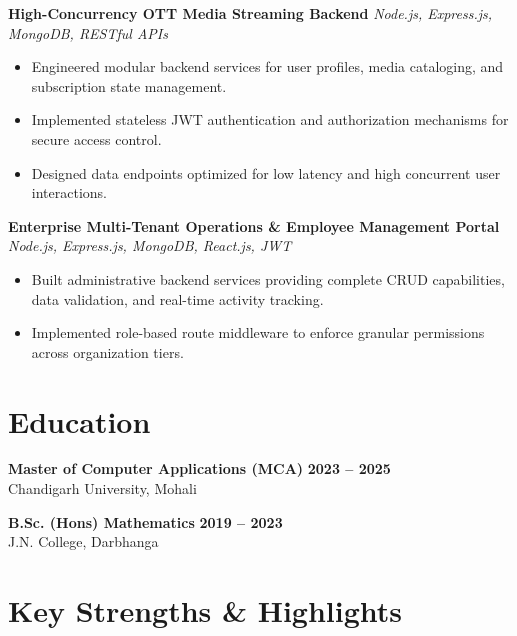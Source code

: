 \documentclass[a4paper,10pt]{article}
\begin{document}
\textbf{High-Concurrency OTT Media Streaming Backend}
\hfill
\textit{Node.js, Express.js, MongoDB, RESTful APIs}

\begin{itemize}

    \item Engineered modular backend services for user profiles, media cataloging, and subscription state management.

    \item Implemented stateless JWT authentication and authorization mechanisms for secure access control.

    \item Designed data endpoints optimized for low latency and high concurrent user interactions.

\end{itemize}


\textbf{Enterprise Multi-Tenant Operations \& Employee Management Portal}
\hfill
\textit{Node.js, Express.js, MongoDB, React.js, JWT}

\begin{itemize}

    \item Built administrative backend services providing complete CRUD capabilities, data validation, and real-time activity tracking.

    \item Implemented role-based route middleware to enforce granular permissions across organization tiers.

\end{itemize}

\section*{Education}

\textbf{Master of Computer Applications (MCA)}
\hfill
\textbf{2023 -- 2025}
\\
Chandigarh University, Mohali

\vspace{3pt}

\textbf{B.Sc. (Hons) Mathematics}
\hfill
\textbf{2019 -- 2023}
\\
J.N. College, Darbhanga

\section*{Key Strengths \& Highlights}
\end{document}

